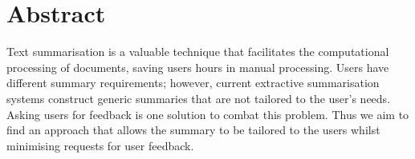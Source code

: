 \documentclass[ %
                    author={James Stephenson},
                supervisor={Dr. Edwin Simpson},
                    degree={MSc},
                     title={PROJECT PLAN},
                  subtitle={ Bayesian Deep Learning For Extractive Test Summarisation},
                      type={},
                      year={2022}]{../additions/dissertation}
\begin{document}
	
	
	
	
	
	\maketitle
	
	
	\frontmatter
	
	
	
	
	
	\chapter*{Abstract}		

		Text summarisation is a valuable technique that facilitates the computational processing of documents, saving users hours in manual processing. Users have different summary requirements; however, current extractive summarisation systems construct generic summaries that are not tailored to the user's needs. Asking users for feedback is one solution to combat this problem. Thus we aim to find an approach that allows the summary to be tailored to the users whilst minimising requests for user feedback.
\end{document}
